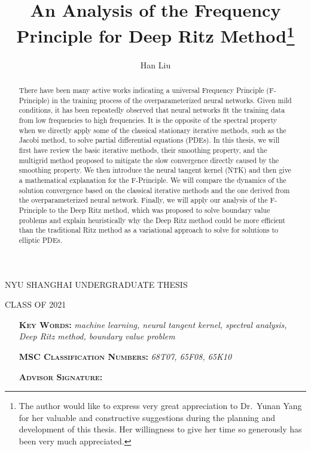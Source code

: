 \documentclass[letterpaper,12pt]{article}
\title{An Analysis of the Frequency Principle for Deep Ritz Method\footnote{\scriptsize The author would like to express very great appreciation to Dr.\ Yunan Yang for her valuable and constructive suggestions during the planning and development of this thesis. Her willingness to give her time so generously has been very much appreciated.}}
\date{}
\author{Han Liu}
\begin{document}
\maketitle

\begin{center}
NYU SHANGHAI UNDERGRADUATE THESIS

CLASS OF 2021
\end{center}

\thispagestyle{empty}
\vspace{5mm}




\begin{abstract}

There have been many active works indicating a universal Frequency Principle (F-Principle) in the training process of the overparameterized neural networks. Given mild conditions, it has been repeatedly observed that neural networks fit the training data from low frequencies to high frequencies. It is the opposite of the spectral property when we directly apply some of the classical stationary iterative methods, such as the Jacobi method, to solve partial differential equations (PDEs). In this thesis, we will first have review the basic iterative methods, their smoothing property, and the multigrid method proposed to mitigate the slow convergence directly caused by the smoothing property. We then introduce the neural tangent kernel (NTK) and then give a mathematical explanation for the F-Principle. We will compare the dynamics of the solution convergence based on the classical iterative methods and the one derived from the overparameterized neural network. Finally, we will apply our analysis of the F-Principle to the Deep Ritz method, which was proposed to solve boundary value problems and explain heuristically why the Deep Ritz method could be more efficient than the traditional Ritz method as a variational approach to solve for solutions to elliptic PDEs.
\end{abstract}

\bigskip


\begin{enumerate}[align=left]
\small
\item[\bf \textsc{Key Words}:]  \textit{machine learning, neural tangent kernel, spectral analysis, Deep Ritz method, boundary value problem} 
\item[\bf \textsc{MSC Classification Numbers}:] \textit{68T07, 65F08, 65K10} %
\item[\bf \textsc{Advisor Signature}:] %

\end{enumerate}
\end{document}
